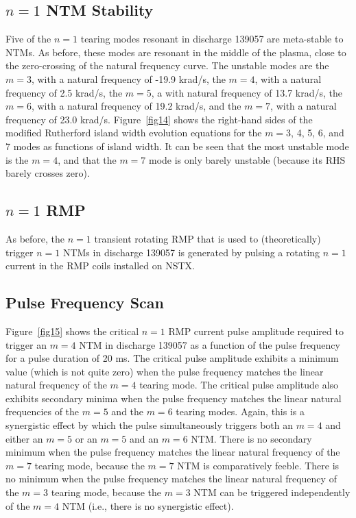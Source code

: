 \documentclass[12pt,prb,aps]{revtex4-1}
\begin{document}
\subsection{$n=1$ NTM Stability}
Five of the $n=1$ tearing modes resonant in discharge 139057 are meta-stable to NTMs. As before, these modes are resonant in the middle of the plasma, close to the zero-crossing of the natural frequency curve. The unstable modes are the $m=3$, with a natural
frequency of -19.9 krad/s,  the $m=4$, with a natural frequency of 2.5 krad/s,  the $m=5$, a with natural
frequency of 13.7 krad/s,  the $m=6$, with a natural frequency of 19.2 krad/s, and the $m=7$, with a natural
frequency of 23.0 krad/s.
 Figure~\ref{fig14} shows the
right-hand sides of the modified Rutherford island width evolution equations for the $m=3$, 4, 5, 6, and 7 modes as functions of island
width. It can be seen that the most unstable mode is the $m=4$, and that the $m=7$ mode is only barely unstable
(because its RHS barely crosses zero). 

\subsection{$n=1$ RMP}
As before, the $n=1$ transient rotating RMP that is used to (theoretically) trigger $n=1$ NTMs in discharge 139057 is generated  by pulsing a rotating $n=1$ current in the RMP coils installed on NSTX. 

\subsection{Pulse Frequency Scan}
Figure~\ref{fig15} shows the critical $n=1$ RMP current  pulse amplitude required to trigger an $m=4$ NTM in discharge 139057 as a
function of the pulse frequency for a pulse duration of 20 ms. The critical pulse amplitude exhibits a minimum value (which is not quite zero) when
the pulse frequency matches the linear natural frequency of the $m=4$ tearing mode. The critical pulse amplitude
also exhibits  secondary minima when the pulse frequency matches the
linear natural frequencies of the $m=5$ and the $m=6$ tearing modes. Again, this is a synergistic effect by which the pulse simultaneously 
triggers both an $m=4$ and either an $m=5$ or an $m=5$ and an $m=6$ NTM. There is no secondary minimum
when the pulse frequency matches the linear natural frequency of the $m=7$ tearing mode, because the
$m=7$ NTM is comparatively feeble. There is no minimum
when the pulse frequency matches the linear natural frequency of the $m=3$ tearing mode, because the
$m=3$ NTM can be triggered independently of the $m=4$ NTM (i.e., there is no synergistic effect). 
\end{document}
